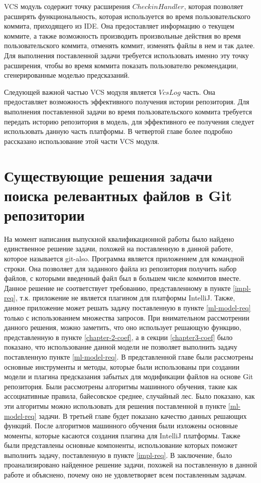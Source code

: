 VCS модуль содержит точку расширения $CheckinHandler$, которая позволяет расширять функциональность, которая используется во время пользовательского коммита, приходящего из IDE. Она предоставляет информацию о текущем коммите, а также возможность производить произвольные действия во время пользовательского коммита, отменять коммит, изменять файлы в нем и так далее. Для выполнения поставленной задачи требуется использовать именно эту точку расширения, чтобы во время коммита показать пользователю рекомендации, сгенерированные моделью предсказаний.

Следующей важной частью VCS модуля является $VcsLog$ часть. Она предоставляет возможность эффективного получения истории репозитория. Для выполнения поставленной задачи во время пользовательского коммита требуется передать историю репозитория в модель, для эффективного ее получения следует использовать данную часть платформы. В четвертой главе более подробно рассказано использование этой части VCS модуля.
\section{Существующие решения задачи поиска релевантных файлов в Git репозитории}\label{git-also-anvaka-label}
На момент написания выпускной квалификационной работы было найдено единственное решение задачи, похожей на поставленную в данной работе, которое называется git-also\cite{git-also-anvaka}. Программа является приложением для командной строки. Она позволяет для заданного файла из репозитория получить набор файлов, с которыми введенный файл был в большем числе коммитов вместе. Данное решение не соответствует требованию, представленному в пункте \ref{impl-req}, т.к. приложение не является плагином для платформы IntelliJ. Также, данное приложение может решать задачу поставленную в пункте \ref{ml-model-req} только с использованием множества запросов. При внимательном рассмотрении данного решения, можно заметить, что оно использует решающую функцию, представленную в пункте \ref{chapter-2-coef}, а в секции \ref{chapter3-coef} было показано, что использование данной модели не позволяет выполнить задачу поставленную пункте \ref{ml-model-req}.
\chapterconclusion
В представленной главе были рассмотрены основные инструменты и методы, которые были использованы при создании модели и плагина предсказания забытых для модификации файлов на основе Git репозитория. Были рассмотрены алгоритмы машинного обучения, такие как ассоциативные правила, байесовское среднее, случайный лес. Было показано, как эти алгоритмы можно использовать для решения поставленной в пункте \ref{ml-model-req} задачи. В третьей главе будет показано качество данных решающих функций. После алгоритмов машинного обучения были изложены основные моменты, которые касаются создания плагина для IntelliJ платформы. Также были представлены основные компоненты, использование которых поможет выполнить задачу, поставленную в пункте \ref{impl-req}. В заключение, было проанализировано найденное решение задачи, похожей на поставленную в данной работе и объяснено, почему оно не удовлетворяет всем поставленным задачам.